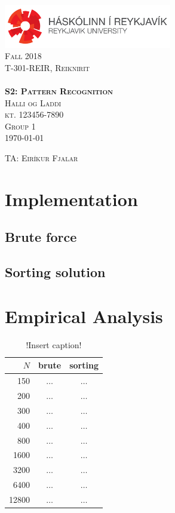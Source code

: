 \documentclass[11pt,a4paper,notitlepage]{article}
\newcommand{\semester}{Fall 2018}
\newcommand{\coursename}{Reiknirit}
\newcommand{\courseid}{T-301-REIR}
\newcommand{\assignment}{S2: Pattern Recognition}
\newcommand{\dateofcompilation}{\today}
\newcommand{\ssn}{kt. 123456-7890}              %
\newcommand{\group}{1}
\newcommand{\teachingassistant}{TA: Eiríkur Fjalar}   %
\newcommand{\students}{
    Halli og Laddi                             %
}
\newcommand{\maketitlepage}[1]
{
    \begin{titlepage}

        \begin{center}
            \includegraphics[width=0.55\textwidth]{./rulogo.png}\\[1.5cm]

            \textsc{\huge \semester}\\[0.8cm]

            {\textsc{\Huge \courseid, \coursename}}\\[0.4cm]
            \textsc{\LARGE }\\[2.5cm]

            \textbf{\textsc{\Huge #1}}\\[3cm]


            \textsc{\huge \students}\\[0.4cm]
            \textsc{\LARGE \ssn}\\[0.4cm]
            \textsc{\LARGE Group \group}\\[1cm]
            \textsc{\Large \dateofcompilation}


        \end{center}

        \vfill

        \begin{flushleft}
            \textsc{\Large \teachingassistant}
        \end{flushleft}

    \end{titlepage}
}
\newcommand{\explanation}[1]{}  %
\begin{document}
    \maketitlepage{\assignment}

\explanation{Directions on performing the assignment are showed here in italics (like this). These should not be included in the report you submit.}

\section{Implementation}

\subsection*{Brute force}

\explanation{Explain \emph{briefly} how you implemented brute force.
            Describe how you implemented compareTo() and the
            slopeTo() methods in the Point data type.}

\subsection*{Sorting solution}
\explanation{Explain \emph{briefly} how you implemented the sorting solution.
           What steps did you do to avoid printing permutations
           and subsegments?}

\section{Empirical Analysis}
\explanation{Fill in the table below with actual running times in
seconds when reasonable (say 180 seconds or less).
You can round to the nearest tenth of a second.}

\begin{table}[htbp]
  \centering
  \caption{!Insert caption!}
        \label{tab:table1}
        \begin{tabular}{|r| c | c |}
        \hline
        $N$ & brute & sorting \\ 
        \hline
        150 & $\ldots$ & $\ldots$ \\
        200 & $\ldots$ & $\ldots$ \\
        300 & $\ldots$ & $\ldots$ \\
        400 & $\ldots$ & $\ldots$ \\
        800 & $\ldots$ & $\ldots$ \\
        1600 & $\ldots$ & $\ldots$ \\
        3200 & $\ldots$ & $\ldots$ \\
        6400 & $\ldots$ & $\ldots$ \\
        12800 & $\ldots$ & $\ldots$ \\
        \hline
        \end{tabular}
\end{table}
\end{document}
